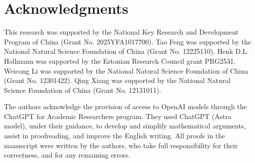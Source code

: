 \documentclass[11pt]{article}
\begin{document}
\section*{Acknowledgments}
This research was supported by the National Key Research and Development
Program of China (Grant No. 2025YFA1017700). Tao Feng was supported by
the National Natural Science Foundation of China (Grant No. 12225110).
Henk D.L. Hollmann was supported by the Estonian Research Council grant
PRG2531. Weicong Li was supported by the National Natural Science Foundation
of China (Grant No. 12301422). Qing Xiang was supported by the National
Natural Science Foundation of China (Grant No. 12131011).

The authors acknowledge the provision of access to OpenAI models through the ChatGPT for Academic Researchers program. They used ChatGPT (Astra model), under their guidance, to develop and simplify mathematical arguments, assist in proofreading, and improve the English writing. All proofs in the manuscript were 
written by the authors, who take full responsibility for their correctness, and for any remaining errors.
\end{document}
